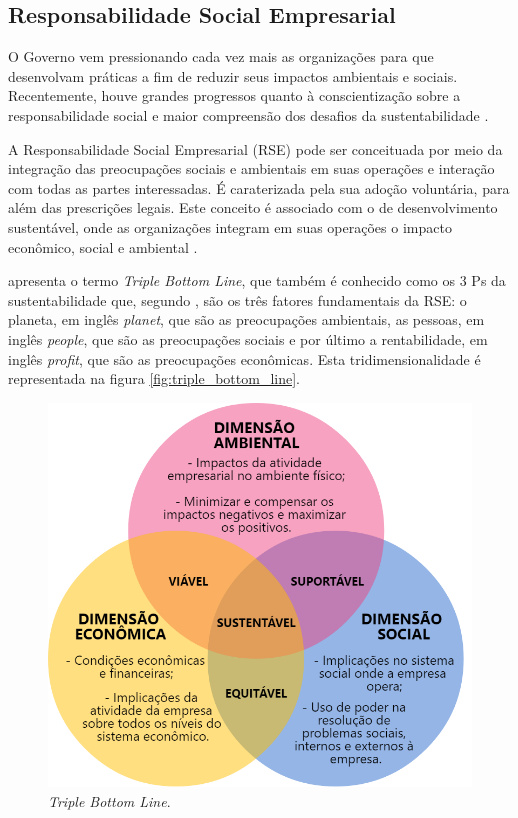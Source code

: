 \subsection{Responsabilidade Social Empresarial}

O Governo vem pressionando cada vez mais as organizações para que desenvolvam práticas a fim de reduzir seus impactos ambientais e sociais. Recentemente, houve grandes progressos quanto à conscientização sobre a responsabilidade social e maior compreensão dos desafios da sustentabilidade \cite{kraemer2005responsabilidade}.

A Responsabilidade Social Empresarial (RSE) pode ser conceituada por meio da integração das preocupações sociais e ambientais em suas operações e interação com todas as partes interessadas. É caraterizada pela sua adoção voluntária, para além das prescrições legais. Este conceito é associado com o de desenvolvimento sustentável, onde as organizações integram em suas operações o impacto econômico, social e ambiental \cite{biorumo}.  

 apresenta o termo \textit{Triple Bottom Line}, que também é conhecido como os 3 Ps da sustentabilidade que, segundo , são os três fatores fundamentais da RSE:  o planeta, em inglês \textit{planet}, que são as preocupações ambientais, as pessoas, em inglês \textit{people}, que são as preocupações sociais e por último a rentabilidade, em inglês \textit{profit}, que são as preocupações econômicas. Esta tridimensionalidade é representada na figura \autoref{fig:triple_bottom_line}.


\begin{figure}[htb]
    \caption{\label{fig:triple_bottom_line}\textit{Triple Bottom Line}.}
    \begin{center}
        \includegraphics[scale=0.4]{imagens/triple-bottom-line.png}
    \end{center}
\end{figure}

